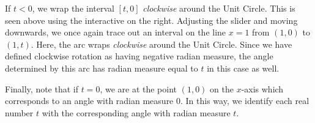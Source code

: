 \documentclass{ximera}
\begin{document}
\begin{center}
\end{center}


If $t<0$, we wrap the interval $[t,0]$ \textit{clockwise} around the Unit Circle.  This is seen above using the interactive on the right.  Adjusting the slider and moving downwards, we once again trace out an interval on the line $x = 1$ from $(1,0)$ to $(1,t)$. Here, the arc wraps \textit{clockwise} around the Unit Circle.  Since we have defined clockwise rotation as having negative radian measure, the angle determined by this arc has radian measure equal to $t$ in this case as well.  

Finally, note that if $t=0$, we are at the point $(1,0)$ on the $x$-axis which corresponds to an angle with radian measure $0$. In this way, we identify each real number $t$ with the corresponding angle with radian measure $t$.
\end{document}
